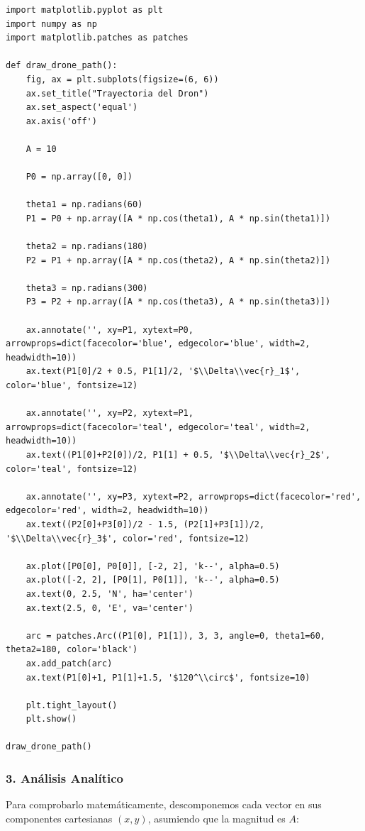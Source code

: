 \documentclass[12pt, a4paper]{article}
\begin{document}
\begin{lstlisting}
import matplotlib.pyplot as plt
import numpy as np
import matplotlib.patches as patches

def draw_drone_path():
    fig, ax = plt.subplots(figsize=(6, 6))
    ax.set_title("Trayectoria del Dron")
    ax.set_aspect('equal')
    ax.axis('off')

    A = 10
    
    P0 = np.array([0, 0])
    
    theta1 = np.radians(60)
    P1 = P0 + np.array([A * np.cos(theta1), A * np.sin(theta1)])
    
    theta2 = np.radians(180)
    P2 = P1 + np.array([A * np.cos(theta2), A * np.sin(theta2)])
    
    theta3 = np.radians(300)
    P3 = P2 + np.array([A * np.cos(theta3), A * np.sin(theta3)])

    ax.annotate('', xy=P1, xytext=P0, arrowprops=dict(facecolor='blue', edgecolor='blue', width=2, headwidth=10))
    ax.text(P1[0]/2 + 0.5, P1[1]/2, '$\\Delta\\vec{r}_1$', color='blue', fontsize=12)

    ax.annotate('', xy=P2, xytext=P1, arrowprops=dict(facecolor='teal', edgecolor='teal', width=2, headwidth=10))
    ax.text((P1[0]+P2[0])/2, P1[1] + 0.5, '$\\Delta\\vec{r}_2$', color='teal', fontsize=12)

    ax.annotate('', xy=P3, xytext=P2, arrowprops=dict(facecolor='red', edgecolor='red', width=2, headwidth=10))
    ax.text((P2[0]+P3[0])/2 - 1.5, (P2[1]+P3[1])/2, '$\\Delta\\vec{r}_3$', color='red', fontsize=12)

    ax.plot([P0[0], P0[0]], [-2, 2], 'k--', alpha=0.5)
    ax.plot([-2, 2], [P0[1], P0[1]], 'k--', alpha=0.5)
    ax.text(0, 2.5, 'N', ha='center')
    ax.text(2.5, 0, 'E', va='center')

    arc = patches.Arc((P1[0], P1[1]), 3, 3, angle=0, theta1=60, theta2=180, color='black')
    ax.add_patch(arc)
    ax.text(P1[0]+1, P1[1]+1.5, '$120^\\circ$', fontsize=10)

    plt.tight_layout()
    plt.show()

draw_drone_path()
\end{lstlisting}

\subsubsection*{3. Análisis Analítico}
Para comprobarlo matemáticamente, descomponemos cada vector en sus componentes cartesianas $(x, y)$, asumiendo que la magnitud es $A$:
\end{document}
